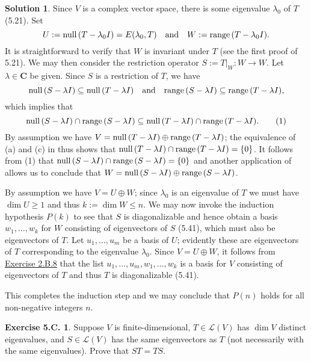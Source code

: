 \documentclass[12pt]{article}
\theoremstyle{definition}
\theoremstyle{exercise}
\newtheorem{exercise}{Exercise 5.C.}
\theoremstyle{solution}
\newtheorem*{solution}{Solution}
\newcommand{\lmap}{\mathcal{L}}
\newcommand{\Null}{\text{null\,}}
\newcommand{\Range}{\text{range\,}}
\newcommand{\quand}{\quad \text{and} \quad}
\newcommand{\C}{\mathbf{C}}
\begin{document}
\begin{solution}
    Since \( V \) is a complex vector space, there is some eigenvalue \( \lambda_0 \) of \( T \) (5.21). Set
    \[
        U := \Null(T - \lambda_0 I) = E(\lambda_0, T) \quand W := \Range(T - \lambda_0 I).
    \]
    It is straightforward to verify that \( W \) is invariant under \( T \) (see the first proof of 5.21). We may then consider the restriction operator \( S := T|_W : W \to W \). Let \( \lambda \in \C \) be given. Since \( S \) is a restriction of \( T \), we have
    \[
        \Null(S - \lambda I) \subseteq \Null(T - \lambda I) \quand \Range(S - \lambda I) \subseteq \Range(T - \lambda I),
    \]
    which implies that
    \[
        \Null(S - \lambda I) \cap \Range(S - \lambda I) \subseteq \Null(T - \lambda I) \cap \Range(T - \lambda I). \tag{1}
    \]
    By assumption we have \( V = \Null(T - \lambda I) \oplus \Range(T - \lambda I) \); the equivalence of (a) and (c) in  thus shows that \( \Null(T - \lambda I) \cap \Range(T - \lambda I) = \{ 0 \} \). It follows from (1) that \( \Null(S - \lambda I) \cap \Range(S - \lambda I) = \{ 0 \} \) and another application of  allows us to conclude that \( W = \Null(S - \lambda I) \oplus \Range(S - \lambda I) \).

    By assumption we have \( V = U \oplus W \); since \( \lambda_0 \) is an eigenvalue of \( T \) we must have \( \dim U \geq 1 \) and thus \( k := \dim W \leq n \). We may now invoke the induction hypothesis \( P(k) \) to see that \( S \) is diagonalizable and hence obtain a basis \( w_1, \ldots, w_k \) for \( W \) consisting of eigenvectors of \( S \) (5.41), which must also be eigenvectors of \( T \). Let \( u_1, \ldots, u_m \) be a basis of \( U \); evidently these are eigenvectors of \( T \) corresponding to the eigenvalue \( \lambda_0 \). Since \( V = U \oplus W \), it follows from \href{https://lew98.github.io/Mathematics/LADR_Section_2_B_Exercises.pdf}{Exercise 2.B.8} that the list \( u_1, \ldots, u_m, w_1, \ldots, w_k \) is a basis for \( V \) consisting of eigenvectors of \( T \) and thus \( T \) is diagonalizable (5.41).

    This completes the induction step and we may conclude that \( P(n) \) holds for all non-negative integers \( n \).
\end{solution}

\begin{exercise}
\label{ex:6}
    Suppose \( V \) is finite-dimensional, \( T \in \lmap(V) \) has \( \dim V \) distinct eigenvalues, and \( S \in \lmap(V) \) has the same eigenvectors as \( T \) (not necessarily with the same eigenvalues). Prove that \( ST = TS \).
\end{exercise}
\end{document}
